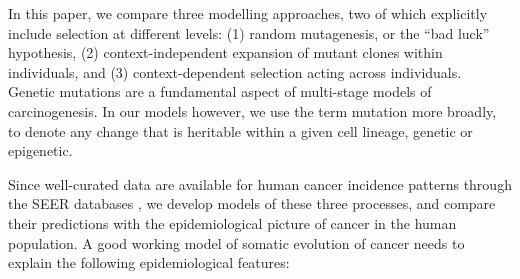 \documentclass[12pt,onecolumn,twoside]{article}
\begin{document}
In this paper, we compare three modelling approaches, two of which explicitly include selection at different levels: (1) random mutagenesis, or the ``bad luck'' hypothesis, (2) context-independent expansion of mutant clones within individuals, and (3) context-dependent selection acting across individuals. Genetic mutations are a fundamental aspect of multi-stage models of carcinogenesis. In our models however, we use the term mutation more broadly, to denote any change that is heritable within a given cell lineage, genetic or epigenetic.

Since well-curated data are available for human cancer incidence patterns through the SEER databases \autocite{AmericanCancerSociety2016}, we develop models of these three processes, and compare their predictions with the epidemiological picture of cancer in the human population. A good working model of somatic evolution of cancer needs to explain the following epidemiological features:
\end{document}
